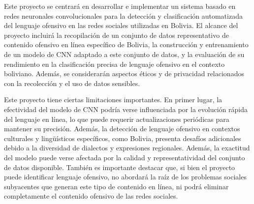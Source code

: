 Este proyecto se centrará en desarrollar e implementar un sistema basado en redes neuronales convolucionales para la detección y clasificación automatizada del lenguaje ofensivo en las redes sociales utilizadas en Bolivia. El alcance del proyecto incluirá la recopilación de un conjunto de datos representativo de contenido ofensivo en línea específico de Bolivia, la construcción y entrenamiento de un modelo de CNN adaptado a este conjunto de datos, y la evaluación de su rendimiento en la clasificación precisa de lenguaje ofensivo en el contexto boliviano. Además, se considerarán aspectos éticos y de privacidad relacionados con la recolección y el uso de datos sensibles.

Este proyecto tiene ciertas limitaciones importantes. En primer lugar, la efectividad del modelo de CNN podría verse influenciada por la evolución rápida del lenguaje en línea, lo que puede requerir actualizaciones periódicas para mantener su precisión. Además, la detección de lenguaje ofensivo en contextos culturales y lingüísticos específicos, como Bolivia, presenta desafíos adicionales debido a la diversidad de dialectos y expresiones regionales. Además, la exactitud del modelo puede verse afectada por la calidad y representatividad del conjunto de datos disponible. También es importante destacar que, si bien el proyecto puede identificar lenguaje ofensivo, no abordará la raíz de los problemas sociales subyacentes que generan este tipo de contenido en línea, ni podrá eliminar completamente el contenido ofensivo de las redes sociales.